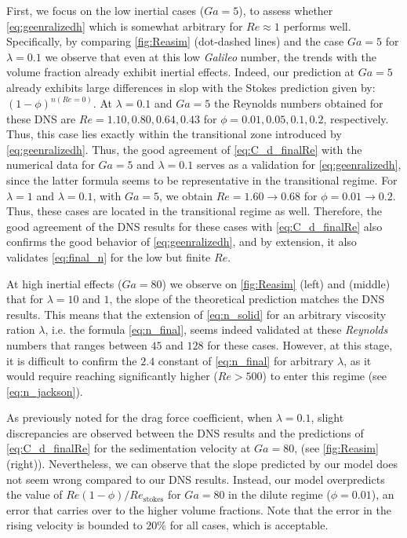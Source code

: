First, we focus on the low inertial cases ($Ga = 5$), to assess whether \ref{eq:geenralizedh} which is somewhat arbitrary for $Re \approx 1$ performs well. 
Specifically, by comparing \ref{fig:Reasim} (dot-dashed lines) and the case $Ga =5$ for $\lambda=0.1$ we observe that even at this low \textit{Galileo} number, the trends with the volume fraction already exhibit inertial effects. 
Indeed, our prediction at $Ga =5$ already exhibits large differences in slop with the Stokes prediction given by: $(1-\phi)^{n(Re=0)}$. 
At $\lambda = 0.1$ and $Ga = 5$ the Reynolds numbers obtained for these DNS are $Re = 1.10, 0.80, 0.64, 0.43$ for $\phi = 0.01, 0.05, 0.1, 0.2$, respectively.
Thus, this case lies exactly within the transitional zone introduced by \ref{eq:geenralizedh}. 
Thus, the good agreement of \ref{eq:C_d_finalRe} with the numerical data for $Ga = 5$ and $\lambda = 0.1$ serves as a validation for \ref{eq:geenralizedh}, since the latter formula seems to be representative in the transitional regime. 
For $\lambda = 1$ and $\lambda = 0.1$, with $Ga = 5$, we obtain $Re = 1.60 \to 0.68$ for $\phi = 0.01 \to 0.2$.
Thus, these cases are located in the transitional regime as well.  
Therefore, the good agreement of the DNS results for these cases with \ref{eq:C_d_finalRe} also confirms the good behavior of \ref{eq:geenralizedh}, and by extension, it also validates \ref{eq:final_n} for the low but finite $Re$. 


At high inertial effects ($Ga = 80$) we observe on \ref{fig:Reasim} (left) and (middle) that for $\lambda = 10$ and $1$, the slope of the theoretical prediction matches the DNS results. 
This means that the extension of \ref{eq:n_solid} for an arbitrary viscosity ration $\lambda$, i.e. the formula \ref{eq:n_final}, seems indeed validated at these \textit{Reynolds} numbers that ranges between $45$ and $128$ for these cases.  
However, at this stage, it is difficult to confirm the $2.4$ constant of \ref{eq:n_final} for arbitrary $\lambda$, as it would require reaching significantly higher ($Re > 500$) to enter this regime (see \ref{eq:n_jackson}). 

As previously noted for the drag force coefficient, when $\lambda=0.1$, slight discrepancies are observed between the DNS results and the predictions of \ref{eq:C_d_finalRe} for the sedimentation velocity at $Ga = 80$, (see \ref{fig:Reasim} (right)). 
Nevertheless, we can observe that the slope predicted by our model does not seem wrong compared to our DNS results. 
Instead, our model overpredicts the value of $Re (1-\phi)  / Re_\text{stokes}$  for  $Ga = 80$ in the dilute regime ($\phi = 0.01$), an error that carries over to the higher volume fractions. 
Note that the error in the rising velocity is bounded to $20\%$ for all cases, which is acceptable. 

